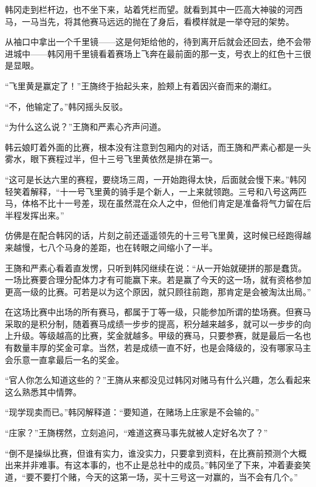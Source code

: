 韩冈走到栏杆边，也不坐下来，站着凭栏而望。就看到其中一匹高大神骏的河西马，一马当先，将其他赛马远远的抛在了身后，看模样就是一举夺冠的架势。

从袖口中拿出一个千里镜——这是何矩给他的，待到离开后就会还回去，绝不会带进城中——韩冈用千里镜看着赛场上飞奔在最前面的那一支，号衣上的红色十三很是显眼。

“飞里黄是赢定了！”王旖终于抬起头来，脸颊上有着因兴奋而来的潮红。

“不，他输定了。”韩冈摇头反驳。

“为什么这么说？”王旖和严素心齐声问道。

韩云娘盯着外面的比赛，根本没有注意到包厢内的对话，而王旖和严素心都是一头雾水，眼下赛程过半，但十三号飞里黄依然是排在第一。

“这可是长达六里的赛程，要绕场三周，一开始跑得太快，后面就会慢下来。”韩冈轻笑着解释，“十一号飞里黄的骑手是个新人，一上来就领跑。三号和八号这两匹马，体格不比十一号差，现在虽然混在众人之中，但他们肯定是准备将气力留在后半程发挥出来。”

仿佛是在配合韩冈的话，片刻之前还遥遥领先的十三号飞里黄，这时候已经跑得越来越慢，七八个马身的差距，也在转眼之间缩小了一半。

王旖和严素心看着直发愣，只听到韩冈继续在说：“从一开始就硬拼的那是蠢货。一场比赛要合理分配体力才有可能赢下来。若是赢了今天的这一场，就有资格参加更高一级的比赛。可若是以为这个原因，就只顾往前跑，那肯定是会被淘汰出局。”

在这场比赛中出场的所有赛马，都属于丁等一级，只能参加所谓的垫场赛。但赛马采取的是积分制，随着赛马成绩一步步的提高，积分越来越多，就可以一步步的向上升级。等级越高的比赛，奖金就越多。甲级的赛马，只要参赛，就是最后一名也有数量丰厚的奖金可拿。当然，若是成绩一直不好，也是会降级的，没有哪家马主会乐意一直拿最后一名的奖金。

“官人你怎么知道这些的？”王旖从来都没见过韩冈对赌马有什么兴趣，怎么看起来这么熟悉其中情弊。

“现学现卖而已。”韩冈解释道：“要知道，在赌场上庄家是不会输的。”

“庄家？”王旖楞然，立刻追问，“难道这赛马事先就被人定好名次了？”

“倒不是操纵比赛，但谁有实力，谁没实力，只要拿到资料，在比赛前预测个大概出来并非难事。有这本事的，也不止是总社中的成员。”韩冈坐了下来，冲着妻妾笑道，“要不要打个赌，今天的这第一场，买十三号这一对赢的，当不会有几个。”

